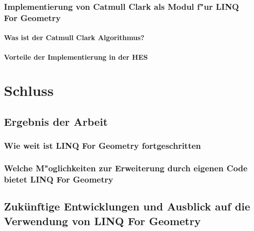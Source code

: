 \documentclass[12pt,a4paper]{scrreprt}
\newcommand{\LFG}{LINQ For Geometry}
\newcommand{\LFGS}{LINQ For Geometry }
\begin{document}
		\subsection {Implementierung von Catmull Clark als Modul f"ur \LFG}
			\subsubsection {Was ist der Catmull Clark Algorithmus?}
			\subsubsection {Vorteile der Implementierung in der HES}





\chapter {Schluss}
	\section {Ergebnis der Arbeit}
		\subsection {Wie weit ist \LFGS fortgeschritten}
		\subsection {Welche M"oglichkeiten zur Erweiterung durch eigenen Code bietet \LFG}
	\section {Zukünftige Entwicklungen und Ausblick auf die Verwendung von \LFG}





\lstlistoflistings
\newpage


\newpage
\end{document}
